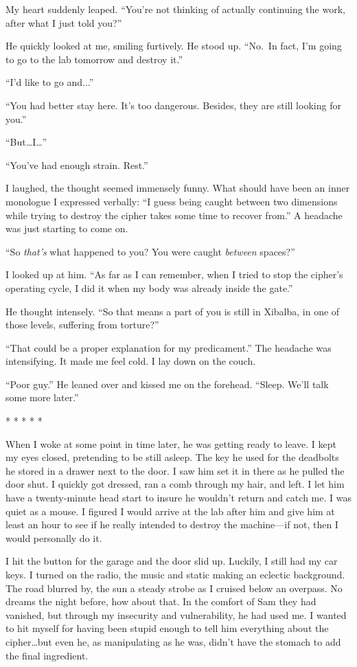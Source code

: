 My heart suddenly leaped. ``You're not thinking of actually continuing
the work, after what I just told you?''

He quickly looked at me, smiling furtively. He stood up. ``No.~In fact,
I'm going to go to the lab tomorrow and destroy it.''

``I'd like to go and...''

``You had better stay here. It's too dangerous. Besides, they are still
looking for you.''

``But\ldots I\ldots{}''

``You've had enough strain. Rest.''

I laughed, the thought seemed immensely funny. What should have been an
inner monologue I expressed verbally: ``I guess being caught between two
dimensions while trying to destroy the cipher takes some time to recover
from.'' A headache was just starting to come on.

``So \emph{that's} what happened to you? You were caught \emph{between}
spaces?''

I looked up at him. ``As far as I can remember, when I tried to stop the
cipher's operating cycle, I did it when my body was already inside the
gate.''

He thought intensely. ``So that means a part of you is still in Xibalba,
in one of those levels, suffering from torture?''

``That could be a proper explanation for my predicament.'' The headache
was intensifying. It made me feel cold. I lay down on the couch.

``Poor guy.'' He leaned over and kissed me on the forehead. ``Sleep.
We'll talk some more later.''

* * * * *

When I woke at some point in time later, he was getting ready to leave.
I kept my eyes closed, pretending to be still asleep. The key he used
for the deadbolts he stored in a drawer next to the door. I saw him set
it in there as he pulled the door shut. I quickly got dressed, ran a
comb through my hair, and left. I let him have a twenty-minute head
start to insure he wouldn't return and catch me. I was quiet as a mouse.
I figured I would arrive at the lab after him and give him at least an
hour to see if he really intended to destroy the machine---if not, then
I would personally do it.

I hit the button for the garage and the door slid up. Luckily, I still
had my car keys. I turned on the radio, the music and static making an
eclectic background. The road blurred by, the sun a steady strobe as I
cruised below an overpass. No dreams the night before, how about that.
In the comfort of Sam they had vanished, but through my insecurity and
vulnerability, he had used me. I wanted to hit myself for having been
stupid enough to tell him everything about the cipher\ldots but even he,
as manipulating as he was, didn't have the stomach to add the final
ingredient.

